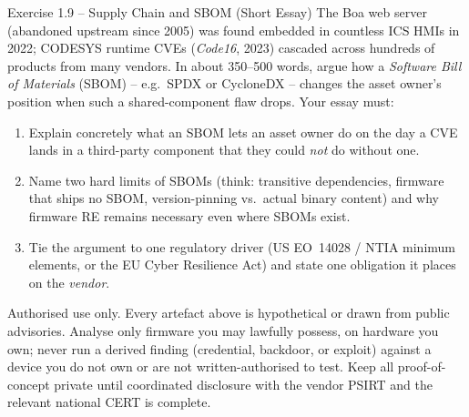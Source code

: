 \documentclass[11pt,a4paper]{article}
\begin{document}
\begin{taskbox}{Exercise 1.9 -- Supply Chain and SBOM (Short Essay)}
The Boa web server (abandoned upstream since 2005) was found embedded in countless ICS HMIs in
2022; CODESYS runtime CVEs (\emph{Code16}, 2023) cascaded across hundreds of products from many
vendors. In about 350--500 words, argue how a \emph{Software Bill of Materials} (SBOM) -- e.g.\
SPDX or CycloneDX -- changes the asset owner's position when such a shared-component flaw drops.
Your essay must:
\begin{enumerate}\setlength{\itemsep}{0pt}
  \item Explain concretely what an SBOM lets an asset owner do on the day a CVE lands in a
        third-party component that they could \emph{not} do without one.
  \item Name two hard limits of SBOMs (think: transitive dependencies, firmware that ships no
        SBOM, version-pinning vs.\ actual binary content) and why firmware RE remains necessary
        even where SBOMs exist.
  \item Tie the argument to one regulatory driver (US EO~14028 / NTIA minimum elements, or the
        EU Cyber Resilience Act) and state one obligation it places on the \emph{vendor}.
\end{enumerate}
\end{taskbox}

\begin{warnbox}
Authorised use only. Every artefact above is hypothetical or drawn from public advisories.
Analyse only firmware you may lawfully possess, on hardware you own; never run a derived finding
(credential, backdoor, or exploit) against a device you do not own or are not written-authorised
to test. Keep all proof-of-concept private until coordinated disclosure with the vendor PSIRT
and the relevant national CERT is complete.
\end{warnbox}
\end{document}
